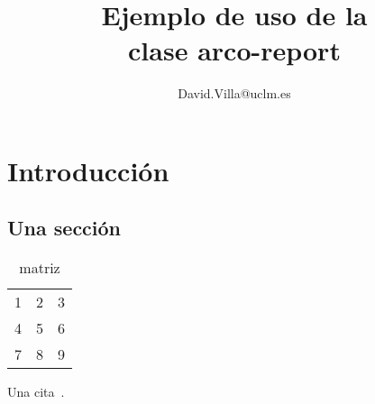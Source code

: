 \documentclass[english]{arco-report}
\title{Ejemplo de uso de la\\clase arco-report}
\author{David.Villa@uclm.es}
\begin{document}
\maketitle


\chapter{Introducción}

\section{Una sección}


\begin{table}
\centering
\begin{tabular}{l c r}
  1 & 2 & 3 \\
  4 & 5 & 6 \\
  7 & 8 & 9 \\
\end{tabular}
\caption{matriz}
\end{table}



Una cita~\cite{Cannon}.


\end{document}
